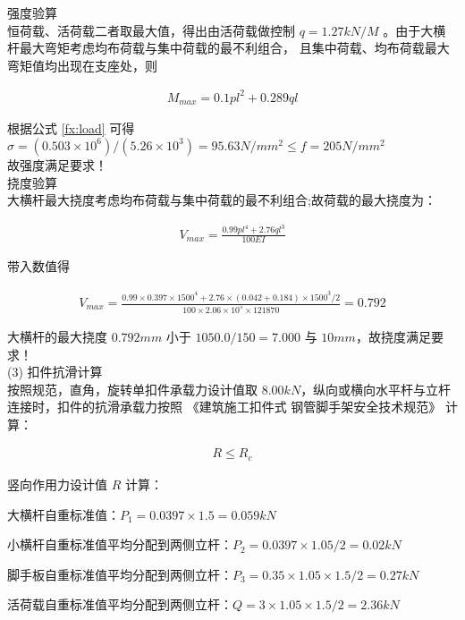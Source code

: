  强度验算\\

恒荷载、活荷载二者取最大值，得出由活荷载做控制 $q=1.27 kN/M$ 。由于大横杆最大弯矩考虑均布荷载与集中荷载的最不利组合，
且集中荷载、均布荷载最大弯矩值均出现在支座处，则

\begin{align}
    M_{max}=0.1pl^2+0.289ql
\end{align}

根据公式 \ref{fx:load} 可得 $\sigma =(0.503\times 10^6)/(5.26\times 10^3)=95.63 N/mm^2 \leq f=205 N/mm^2$\\
故强度满足要求！\\

 挠度验算\\

大横杆最大挠度考虑均布荷载与集中荷载的最不利组合;故荷载的最大挠度为：

\begin{align}
    V_{max}=\frac{0.99pl^4+2.76ql^3}{100EI}
\end{align}

带入数值得

\begin{align}
    V_{max}=\frac{0.99\times 0.397\times 1500^4+2.76\times (0.042+0.184)\times 1500^3/2}{100\times 2.06\times 10^5\times 121870}=0.792
\end{align}

大横杆的最大挠度 $0.792mm$ 小于 $1050.0/150=7.000$ 与 $10mm$，故挠度满足要求！ \\

(3) 扣件抗滑计算\\

按照规范，直角，旋转单扣件承载力设计值取 $8.00kN$，纵向或横向水平杆与立杆连接时，扣件的抗滑承载力按照 《建筑施工扣件式 钢管脚手架安全技术规范》 计算：

\begin{align}
    \label{fx:rc}
    R \leq R_c
\end{align}

竖向作用力设计值 $R$ 计算：

 大横杆自重标准值：$P_1=0.0397×1.5=0.059kN$

 小横杆自重标准值平均分配到两侧立杆：$P_2=0.0397×1.05/2=0.02kN$ 

 脚手板自重标准值平均分配到两侧立杆：$P_3=0.35×1.05×1.5/2=0.27kN$ 

 活荷载自重标准值平均分配到两侧立杆：$Q=3×1.05×1.5/2=2.36kN$

